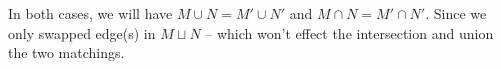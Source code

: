 \documentclass[11pt]{article}
\begin{document}
In both cases, we will have $M \cup N = M' \cup N'$ and $M \cap N = M' \cap N'$. Since we only swapped edge(s) in $M \sqcup N$ -- which won't effect the intersection and union the two matchings.\newline





%
% 
% 
\end{document}
